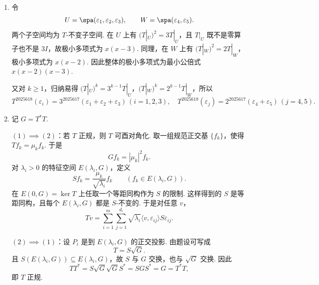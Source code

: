 \begin{enumerate}
\begin{enumerate}
        \item 假. 对称矩阵只有在规范正交基下才对应自伴算子. 例如在 $\mathbf{R}^2$ 的基 $\{(1,0),(1,1)\}$ 下矩阵 $\begin{pmatrix}0&1\\1&0\end{pmatrix}$ 是对称的，但它对应的算子在自然基下的矩阵为 $\begin{pmatrix}1&1\\0&-1\end{pmatrix}$，不是对称矩阵，因此不是标准内积下的自伴算子.

        \item 真. 设 $s$ 是奇异值，则 $s = \sqrt{\lambda}$，$\lambda$ 为 $G = T^*T$ 的特征值。取单位特征向量 $\alpha$，则 $\|T\alpha\|^2 = \langle T^*T\alpha, \alpha \rangle = \lambda\langle \alpha,\alpha \rangle=\lambda$，故 $\|T\alpha\| = s$.
    \end{enumerate}

    \item 令
    \[
        U=\spa(\varepsilon_1,\varepsilon_2,\varepsilon_3),\qquad
        W=\spa(\varepsilon_4,\varepsilon_5).
    \]
    两个子空间均为 $T$-不变子空间. 在 $U$ 上有 $(T|_U)^2=3T|_U$，且 $T|_U$ 既不是零算子也不是 $3I$，故极小多项式为 $x(x-3)$. 同理，在 $W$ 上有 $(T|_W)^2=2T|_W$，极小多项式为 $x(x-2)$. 因此整体的极小多项式为最小公倍式 $x(x-2)(x-3)$.

    又对 $k\geqslant 1$，归纳易得 $(T|_U)^k=3^{k-1}T|_U$，$(T|_W)^k=2^{k-1}T|_W$，所以
    \[
        T^{2025618}(\varepsilon_i) = 3^{2025617}(\varepsilon_1+\varepsilon_2+\varepsilon_3) \, (i=1,2,3), \quad T^{2025618}(\varepsilon_j) = 2^{2025617}(\varepsilon_4+\varepsilon_5) \, (j=4,5).
    \]

    \item 记 $G=T^*T$.

    $(1)\implies(2)$：若 $T$ 正规，则 $T$ 可酉对角化. 取一组规范正交基 $\{f_k\}$，使得 $Tf_k=\mu_k f_k$. 于是
    \[
        Gf_k=|\mu_k|^2f_k.
    \]
    对 $\lambda_i>0$ 的特征空间 $E(\lambda_i,G)$，定义
    \[
        Sf_k=\frac{\mu_k}{\sqrt{\lambda_i}}f_k\qquad(f_k\in E(\lambda_i,G)).
    \]
    在 $E(0,G)=\ker T$ 上任取一个等距同构作为 $S$ 的限制. 这样得到的 $S$ 是等距同构，且每个 $E(\lambda_i,G)$ 都是 $S$-不变的. 于是对任意 $v$，
    \[
        Tv=\sum_{i=1}^m\sum_{j=1}^{d_i}\sqrt{\lambda_i}
        \langle v,\varepsilon_{ij}\rangle S\varepsilon_{ij}.
    \]

    $(2)\implies(1)$：设 $P_i$ 是到 $E(\lambda_i,G)$ 的正交投影. 由题设可写成
    \[
        T=S\sqrt{G}.
    \]
    且 $S(E(\lambda_i,G))\subseteq E(\lambda_i,G)$，故 $S$ 与 $G$ 交换，也与 $\sqrt{G}$ 交换. 因此
    \[
        TT^*=S\sqrt{G}\sqrt{G}S^*=SGS^*=G=T^*T,
    \]
    即 $T$ 正规.


\end{enumerate}
